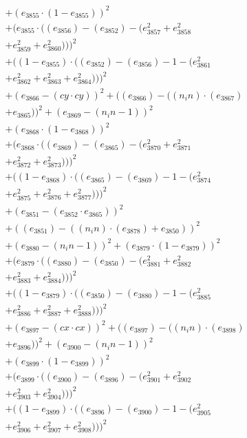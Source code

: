 \documentclass[10pt, a4paper]{article}
\begin{document}
\begin{align*}
& + (e_{3855}  \cdot  (1 - e_{3855}))^{2} \\
& + (e_{3855}  \cdot  ((e_{3856}) - (e_{3852}) - (e_{3857}^{2} + e_{3858}^{2} \\
& + e_{3859}^{2} + e_{3860}^{2})))^{2} \\
& + ((1 - e_{3855})  \cdot  ((e_{3852}) - (e_{3856}) - 1 - (e_{3861}^{2} \\
& + e_{3862}^{2} + e_{3863}^{2} + e_{3864}^{2})))^{2} \\
& + (e_{3866} - (cy  \cdot  cy))^{2} + ((e_{3866}) - ((n_in)  \cdot  (e_{3867}) \\
& + e_{3865}))^{2} + (e_{3869} - (n_in - 1))^{2} \\
& + (e_{3868}  \cdot  (1 - e_{3868}))^{2} \\
& + (e_{3868}  \cdot  ((e_{3869}) - (e_{3865}) - (e_{3870}^{2} + e_{3871}^{2} \\
& + e_{3872}^{2} + e_{3873}^{2})))^{2} \\
& + ((1 - e_{3868})  \cdot  ((e_{3865}) - (e_{3869}) - 1 - (e_{3874}^{2} \\
& + e_{3875}^{2} + e_{3876}^{2} + e_{3877}^{2})))^{2} \\
& + (e_{3851} - (e_{3852}  \cdot  e_{3865}))^{2} \\
& + ((e_{3851}) - ((n_in)  \cdot  (e_{3878}) + e_{3850}))^{2} \\
& + (e_{3880} - (n_in - 1))^{2} + (e_{3879}  \cdot  (1 - e_{3879}))^{2} \\
& + (e_{3879}  \cdot  ((e_{3880}) - (e_{3850}) - (e_{3881}^{2} + e_{3882}^{2} \\
& + e_{3883}^{2} + e_{3884}^{2})))^{2} \\
& + ((1 - e_{3879})  \cdot  ((e_{3850}) - (e_{3880}) - 1 - (e_{3885}^{2} \\
& + e_{3886}^{2} + e_{3887}^{2} + e_{3888}^{2})))^{2} \\
& + (e_{3897} - (cx  \cdot  cx))^{2} + ((e_{3897}) - ((n_in)  \cdot  (e_{3898}) \\
& + e_{3896}))^{2} + (e_{3900} - (n_in - 1))^{2} \\
& + (e_{3899}  \cdot  (1 - e_{3899}))^{2} \\
& + (e_{3899}  \cdot  ((e_{3900}) - (e_{3896}) - (e_{3901}^{2} + e_{3902}^{2} \\
& + e_{3903}^{2} + e_{3904}^{2})))^{2} \\
& + ((1 - e_{3899})  \cdot  ((e_{3896}) - (e_{3900}) - 1 - (e_{3905}^{2} \\
& + e_{3906}^{2} + e_{3907}^{2} + e_{3908}^{2})))^{2} \\

\end{align*}
\end{document}
